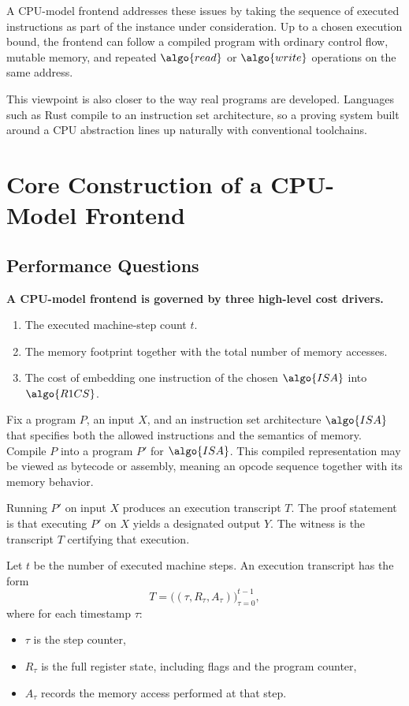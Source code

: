 \documentclass[11pt]{article}
\begin{document}
A CPU-model frontend addresses these issues by taking the sequence of executed instructions as part of the instance under consideration. Up to a chosen execution bound, the frontend can follow a compiled program with ordinary control flow, mutable memory, and repeated $\algo{read}$ or $\algo{write}$ operations on the same address.

This viewpoint is also closer to the way real programs are developed. Languages such as Rust compile to an instruction set architecture, so a proving system built around a CPU abstraction lines up naturally with conventional toolchains.

\section{Core Construction of a CPU-Model Frontend}

\subsection{Performance Questions}

\begin{highlight}[title={CPU-Model Frontend Cost Drivers}]
\textbf{A CPU-model frontend is governed by three high-level cost drivers.}
\begin{enumerate}[leftmargin=2em, topsep=2pt, itemsep=0pt]
  \item The executed machine-step count $t$.
  \item The memory footprint together with the total number of memory accesses.
  \item The cost of embedding one instruction of the chosen $\algo{ISA}$ into $\algo{R1CS}$.
\end{enumerate}
\end{highlight}

Fix a program $P$, an input $X$, and an instruction set architecture $\algo{ISA}$ that specifies both the allowed instructions and the semantics of memory. Compile $P$ into a program $P'$ for $\algo{ISA}$. This compiled representation may be viewed as bytecode or assembly, meaning an opcode sequence together with its memory behavior.

Running $P'$ on input $X$ produces an execution transcript $T$. The proof statement is that executing $P'$ on $X$ yields a designated output $Y$. The witness is the transcript $T$ certifying that execution.

\begin{definition}
Let $t$ be the number of executed machine steps. An execution transcript has the form
\[
  T = \bigl((\tau, R_\tau, A_\tau)\bigr)_{\tau=0}^{t-1},
\]
where for each timestamp $\tau$:
\begin{itemize}
  \item $\tau$ is the step counter,
  \item $R_\tau$ is the full register state, including flags and the program counter,
  \item $A_\tau$ records the memory access performed at that step.
\end{itemize}
\end{definition}
\end{document}
